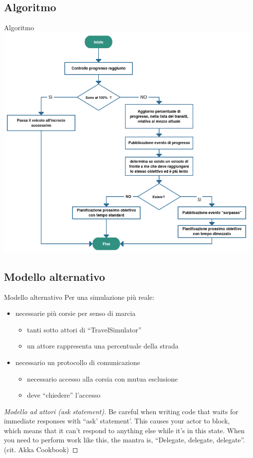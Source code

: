 \subsection{Algoritmo}
\begin{frame}{Algoritmo}
	\centering
	\includegraphics[scale=0.27]{images/algorithm.png}
\end{frame}

\subsection{Modello alternativo}
\begin{frame}{Modello alternativo}
	Per una simulazione più reale:
	\begin{itemize}
		\item{\footnotesize{necessarie più corsie per senso di marcia}}
		\begin{itemize}
			\item{\scriptsize{tanti sotto attori di ``TravelSimulator''}}
			\item{\scriptsize{un attore rappresenta una percentuale della strada}}
		\end{itemize}
		\item{\footnotesize{necessario un protocollo di comunicazione}}
		\begin{itemize}
			\item{\scriptsize{necessario accesso alla corsia con mutua esclusione}}
			\item{\scriptsize{deve ``chiedere'' l'accesso}}
		\end{itemize}
	\end{itemize}
	\begin{proof}[Modello ad attori \scriptsize{(ask statement)}]
		\scriptsize{Be careful when writing code that waits for immediate responses with ``ask' statement'. This causes your actor to block, which means that it can’t respond to anything else while it’s in this state. When you need to perform work like this, the mantra is, ``Delegate, delegate, delegate''. (cit. Akka Cookbook)}
	\end{proof}
\end{frame}